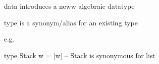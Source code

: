 data introduces a neww algebraic datatype

type is a synonym/alias for an existing type

e.g.

type Stack w = [w]  -- Stack is synonymous for list